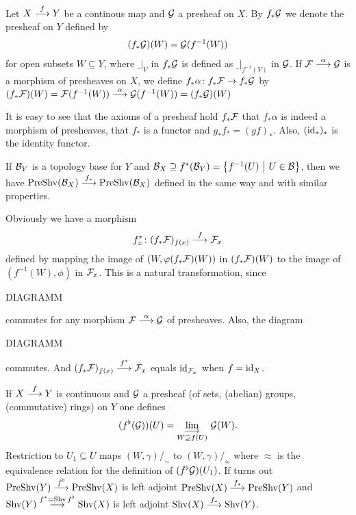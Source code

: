 \documentclass[a4paper,parskip=half,numbers=enddot, DIV=12]{scrreprt}
\begin{document}
    \begin{defi} 
        Let $X\morphism[f] Y$ be a continous map and $\mathcal{G}$ a presheaf on $X$. By $f_*\mathcal{G}$ we denote the presheaf on $Y$ defined by 
        \begin{align*}
            (f_*\mathcal{G})(W) = \mathcal{G}(f^{-1}(W))
        \end{align*}
        for open subsets $W\subseteq Y$, where $\_|_V$ in $f_*\mathcal{G}$ is defined as $\_|_{f^{-1}(V)}$ in $\mathcal{G}$. If $\Ff\morphism[\alpha] \Gg$ is a morphism of presheaves on $X$, we define $f_*\alpha\colon f_*\Ff\morphism f_*\Gg$ by $(f_*\Ff)(W) = \Ff(f^{-1}(W)) \morphism[\alpha] \Gg(f^{-1}(W)) = (f_*\Gg)(W)$
    \end{defi}
    \begin{fact}
        It is easy to see that the axioms of a presheaf hold $f_*\mathcal{F}$ that $f_*\alpha$ is indeed a morphism of presheaves, that $f_*$ is a functor and $g_*f_* = (gf)_*$. Also, $(\operatorname{id}_*)_*$ is the identity functor.
    \end{fact}
    \begin{rem*}
        If $\mathcal{B}_Y$ is a topology base for $Y$ and $\mathcal{B}_X\supseteq f^*(\mathcal{B}_Y) = \left\{f^{-1}(U) \ \middle|\  U\in\mathcal{B}\right\}$, then we have $\cat{PreShv}(\Bb_X) \morphism[f_*]\cat{PreShv}(\Bb_X)$ defined in the same way and with similar properties.
    \end{rem*}
    \begin{rem}
        Obviously we have a morphism
        \begin{align}
            f_x^*\colon (f_* \Ff)_{f(x)} \morphism[f] \Ff_x \lbl{eq:four}
        \end{align}
        defined by mapping the image of $(W,\varphi(f_*\mathcal{F})(W))$ in $(f_* \mathcal{F})(W)$ to the image of $(f^{-1}(W),\phi)$ in $\mathcal{F}_x$. This is a natural transformation, since
        
        DIAGRAMM
        
        commutes for any morphism $\Ff\morphism[\alpha] \Gg$ of presheaves. Also, the diagram
        
        DIAGRAMM
        
        commutes. And $(f_*\Ff)_{f(x)} \morphism[f^*] \Ff_x$ equals $\operatorname{id}_{\mathcal{F}_x}$ when $f=\operatorname{id}_X$.
    \end{rem}
    \begin{rem*}
        If $X\morphism[f] Y$ is continuous and $\mathcal{G}$ a presheaf (of sets, (abelian) groups, (commutative) rings) on $Y$ one defines
        \begin{align*}
            (f^\flat(\Gg))(U) = \colimit[W\supseteq f(U)] \Gg(W) .
        \end{align*}
        Restriction to $U_1\subseteq U$ maps $(W,\gamma)/_\sim$ to $(W,\gamma)/_\approx$ where $\approx$ is the equivalence relation for the definition of $(f^\flat \mathcal{G})(U_1)$. If turns out $\cat{PreShv}(Y)  \morphism[f^\flat] \cat{PreShv}(X)$ is left adjoint $\cat{PreShv}(X) \morphism[f_*] \cat{PreShv}(Y)$ and $\cat{Shv}(Y)  \morphism[f^* = \cat{Shv}f^\flat] \cat{Shv}(X)$ is left adjoint $\cat{Shv}(X) \morphism[f_*] \cat{Shv}(Y)$.
    \end{rem*}
    
\end{document}
